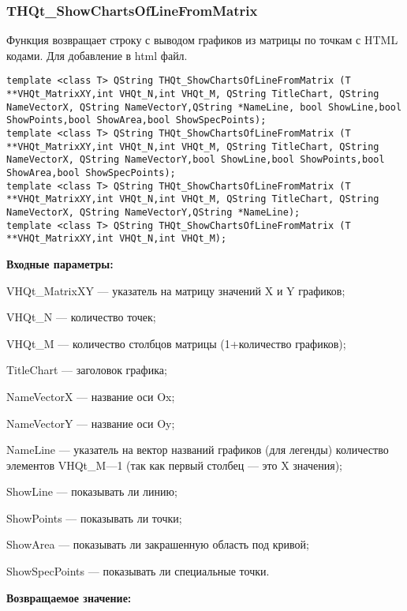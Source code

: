 \documentclass[a4paper,12pt]{article}
\begin{document}
\subsubsection{THQt\_ShowChartsOfLineFromMatrix}\label{THQt_ShowChartsOfLineFromMatrix}

Функция возвращает строку с выводом графиков из матрицы по точкам с HTML кодами. Для добавление в html файл.


\begin{lstlisting}[label=code_syntax_THQt_ShowChartsOfLineFromMatrix,caption=Синтаксис]
template <class T> QString THQt_ShowChartsOfLineFromMatrix (T **VHQt_MatrixXY,int VHQt_N,int VHQt_M, QString TitleChart, QString NameVectorX, QString NameVectorY,QString *NameLine, bool ShowLine,bool ShowPoints,bool ShowArea,bool ShowSpecPoints);
template <class T> QString THQt_ShowChartsOfLineFromMatrix (T **VHQt_MatrixXY,int VHQt_N,int VHQt_M, QString TitleChart, QString NameVectorX, QString NameVectorY,bool ShowLine,bool ShowPoints,bool ShowArea,bool ShowSpecPoints);
template <class T> QString THQt_ShowChartsOfLineFromMatrix (T **VHQt_MatrixXY,int VHQt_N,int VHQt_M, QString TitleChart, QString NameVectorX, QString NameVectorY,QString *NameLine);
template <class T> QString THQt_ShowChartsOfLineFromMatrix (T **VHQt_MatrixXY,int VHQt_N,int VHQt_M);
\end{lstlisting}

\textbf{Входные параметры:}
 
    VHQt\_MatrixXY --- указатель на матрицу значений X и Y графиков;
 
    VHQt\_N --- количество точек;
 
    VHQt\_M --- количество столбцов матрицы (1+количество графиков);
 
    TitleChart --- заголовок графика;
 
    NameVectorX --- название оси Ox;
 
    NameVectorY --- название оси Oy;
 
    NameLine --- указатель на вектор названий графиков (для легенды) количество элементов VHQt\_M---1 (так как первый столбец --- это X значения);
 
    ShowLine --- показывать ли линию;
 
    ShowPoints --- показывать ли точки;
 
    ShowArea --- показывать ли закрашенную область под кривой;
 
    ShowSpecPoints --- показывать ли специальные точки.

\textbf{Возвращаемое значение:}
\end{document}
